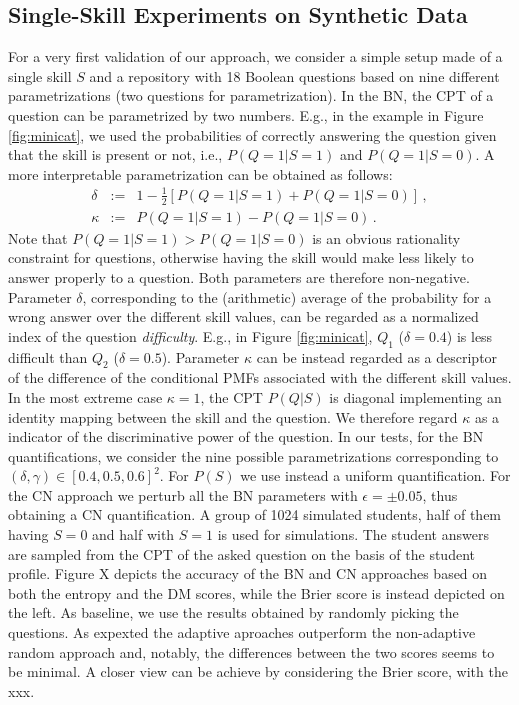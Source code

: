 \documentclass[runningheads]{llncs}
\begin{document}
\subsection{Single-Skill Experiments on Synthetic Data}
For a very first validation of our approach, we consider a simple setup made of a single skill $S$ and a repository with 18 Boolean questions based on nine different parametrizations (two questions for parametrization). In the BN, the CPT of a question can be parametrized by two numbers. E.g., in the example in Figure \ref{fig:minicat}, we used the probabilities of correctly answering the question given that the skill is present or not, i.e., $P(Q=1|S=1)$ and $P(Q=1|S=0)$. A more interpretable parametrization can be obtained as follows:
\begin{eqnarray}
\delta &:=& 1-\frac{1}{2}[P(Q=1|S=1)+P(Q=1|S=0)]\,,\\
\kappa &:=& P(Q=1|S=1)-P(Q=1|S=0)\,.
\end{eqnarray}
Note that $P(Q=1|S=1)>P(Q=1|S=0)$ is an obvious rationality constraint for questions, otherwise having the skill would make less likely to answer properly to a question. Both parameters are therefore non-negative. Parameter $\delta$, corresponding to the (arithmetic) average of the probability for a wrong answer over the different skill values, can be regarded as a normalized index of the question \emph{difficulty}. E.g., in Figure \ref{fig:minicat}, $Q_1$ ($\delta=0.4$) is less difficult than $Q_2$ ($\delta=0.5$). Parameter $\kappa$ can be instead regarded as a descriptor of the difference of the conditional PMFs associated with the different skill values. In the most extreme case $\kappa=1$, the CPT $P(Q|S)$ is diagonal implementing an identity mapping between the skill and the question. We therefore regard $\kappa$ as a indicator of the discriminative power of the question. In our tests, for the BN quantifications, we consider the nine possible parametrizations corresponding to $(\delta,\gamma) \in [0.4,0.5,0.6]^2$. For $P(S)$ we use instead a uniform quantification. For the CN approach we perturb all the BN parameters with $\epsilon=\pm 0.05$, thus obtaining a CN quantification. A group of 1024 simulated students, half of them having $S=0$ and half with $S=1$ is used for simulations. The student answers are sampled from the CPT of the asked question on the basis of the student profile. Figure X depicts the accuracy of the BN and CN approaches based on both the entropy and the DM scores, while the Brier score is instead depicted on the left. As baseline, we use the results obtained by randomly picking the questions. As expexted the adaptive aproaches outperform the non-adaptive random approach and, notably, the differences between the two scores seems to be minimal. A closer view can be achieve by considering the Brier score, with the xxx.
\end{document}
